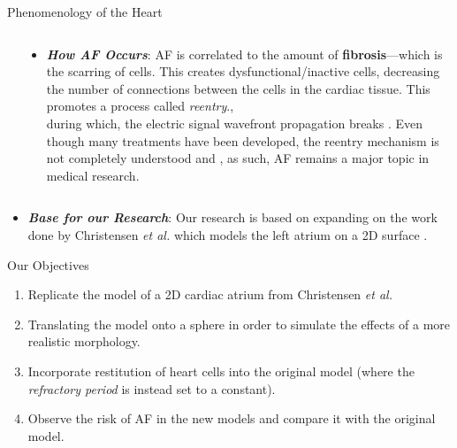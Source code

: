 \documentclass[final,hyperref={pdfpagelabels=false}]{beamer}
\begin{document}
\begin{frame}[t]
\begin{columns}[t]
\begin{column}{.465\textwidth}
\begin{block}{Phenomenology of the Heart}
\begin{columns}
\begin{column}{.43\textwidth}
\end{column}
\begin{column}{.54\textwidth}
\begin{itemize}
	\item \textbf{\textit{How AF Occurs}}: AF is correlated to the amount of \textbf{ fibrosis}---which is the scarring of cells. This creates dysfunctional/inactive cells, decreasing the number of connections between the cells in the cardiac tissue. This promotes a process called \textit{ reentry}.,\\
	during which, the electric signal wavefront propagation breaks \cite{Alonso}. 
	Even though many treatments have been developed, the reentry mechanism is not completely understood and , as such, AF remains a major topic in medical research. \\
	\end{itemize}

	
	
\end{column}

\end{columns}

	\begin{itemize}
	
	
 \item \textbf{\textit{Base for our Research}}: Our research is based on expanding on the work done by Christensen \emph{et al.} which models the left atrium on a 2D surface \cite{Christensen}.
	\end{itemize}
\end{block}
\begin{block}{Our Objectives}

\begin{enumerate}
\item Replicate the model of a 2D cardiac atrium from Christensen \emph{et al.}
\item  Translating the model onto a sphere in order to simulate the effects of a more realistic morphology. 
\item Incorporate restitution of heart cells into the original model (where the \textit{refractory period} is instead set to a constant).
\item Observe the risk of AF in the new models and compare it with the original model.
\end{enumerate}


\end{block}



\end{column}
\end{columns}
\end{frame}
\end{document}
